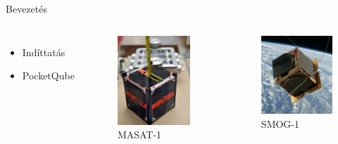 \documentclass[aspectratio=169,xcolor=dvipsnames]{beamer}
\begin{document}
\begin{frame}{Bevezetés}
	\begin{columns}[c]

	\begin{itemize}
        \item Indíttatás
	\item PocketQube
	\end{itemize}

	\begin{figure}[h]
	\centering
		\includegraphics[width=0.4\linewidth]{masat.png}
		\caption{MASAT-1}

	\end{figure}
	\begin{figure}[h]
		\centering
		\includegraphics[width=0.45\linewidth]{smog1.png}
		\caption{SMOG-1}
	\end{figure}

	\end{columns}

\end{frame}

\end{document}
